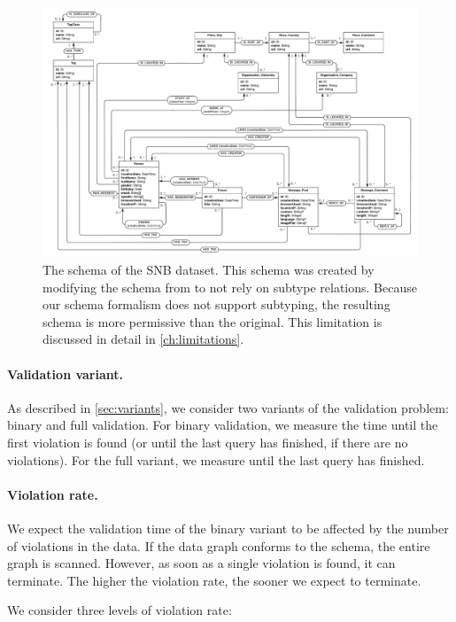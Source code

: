 \documentclass{report}
\theoremstyle{definition}
\begin{document}
\begin{figure}[t]
  \centering
  \includegraphics[width=\textwidth]{figures/schema-snb.pdf}
  \caption[The schema of the SNB dataset]{The schema of the SNB dataset. This schema was created by modifying the schema from \citet{angles2020snb} to not rely on subtype relations. Because our schema formalism does not support subtyping, the resulting schema is more permissive than the original. This limitation is discussed in detail in \autoref{ch:limitations}.}
  \label{fig:schema-snb}
\end{figure}

\paragraph{Validation variant.} As described in \autoref{sec:variants}, we consider two variants of the validation problem: binary and full validation. For binary validation, we measure the time until the first violation is found (or until the last query has finished, if there are no violations). For the full variant, we measure until the last query has finished.

\paragraph{Violation rate.} We expect the validation time of the binary variant to be affected by the number of violations in the data. If the data graph conforms to the schema, the entire graph is scanned. However, as soon as a single violation is found, it can terminate. The higher the violation rate, the sooner we expect to terminate.

We consider three levels of violation rate:
\end{document}
